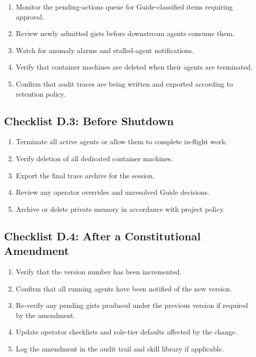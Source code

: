 \documentclass[12pt,letterpaper]{article}
\begin{document}
\begin{enumerate}
    \item Monitor the pending-actions queue for Guide-classified items requiring approval.
    \item Review newly admitted gists before downstream agents consume them.
    \item Watch for anomaly alarms and stalled-agent notifications.
    \item Verify that container machines are deleted when their agents are terminated.
    \item Confirm that audit traces are being written and exported according to retention policy.
\end{enumerate}

\subsection{Checklist D.3: Before Shutdown}

\begin{enumerate}
    \item Terminate all active agents or allow them to complete in-flight work.
    \item Verify deletion of all dedicated container machines.
    \item Export the final trace archive for the session.
    \item Review any operator overrides and unresolved Guide decisions.
    \item Archive or delete private memory in accordance with project policy.
\end{enumerate}

\subsection{Checklist D.4: After a Constitutional Amendment}

\begin{enumerate}
    \item Verify that the version number has been incremented.
    \item Confirm that all running agents have been notified of the new version.
    \item Re-verify any pending gists produced under the previous version if required by the amendment.
    \item Update operator checklists and role-tier defaults affected by the change.
    \item Log the amendment in the audit trail and skill library if applicable.
\end{enumerate}
\end{document}
